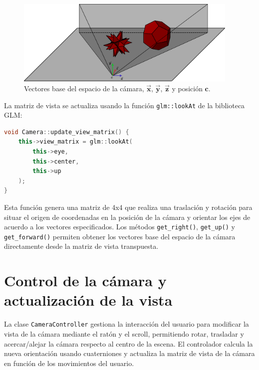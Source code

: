 \begin{figure} [!hbt]
    \begin{center}
        \includegraphics[width=0.95\textwidth]{imagenes/view_matrix_vectors_diagram.pdf}
    \end{center}
    \caption{Vectores base del espacio de la cámara, $\vec{\bm{x}}$, $\vec{\bm{y}}$, $\vec{\bm{z}}$ y posición $\bm{c}$.}\label{fig:camera_view_matrix_vectors_diagram}
\end{figure}

La matriz de vista se actualiza usando la función \texttt{glm::lookAt} de la
biblioteca GLM:

\begin{lstlisting}[language=C++,caption={Actualización de la matriz de vista en Copper}]
void Camera::update_view_matrix() {
    this->view_matrix = glm::lookAt(
        this->eye,
        this->center,
        this->up
    );
}
\end{lstlisting}

Esta función genera una matriz de 4x4 que realiza una traslación y rotación
para situar el origen de coordenadas en la posición de la cámara y orientar los
ejes de acuerdo a los vectores especificados. Los métodos
\texttt{get\_right()}, \texttt{get\_up()} y \texttt{get\_forward()} permiten
obtener los vectores base del espacio de la cámara directamente desde la matriz
de vista transpuesta.

\section{Control de la cámara y actualización de la vista}

La clase \texttt{CameraController} gestiona la interacción del usuario para
modificar la vista de la cámara mediante el ratón y el scroll, permitiendo
rotar, trasladar y acercar/alejar la cámara respecto al centro de la escena. El
controlador calcula la nueva orientación usando cuaterniones y actualiza la
matriz de vista de la cámara en función de los movimientos del usuario.

